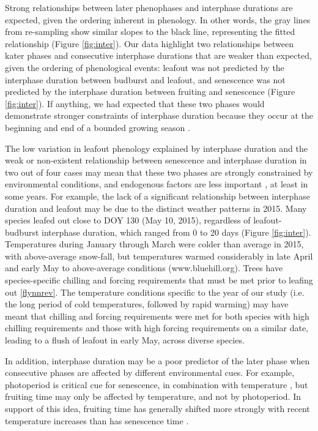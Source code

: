 \documentclass{article}
\begin{document}
\par Strong relationships between later phenophases and interphase durations are expected, given the ordering inherent in phenology.  In other words, the gray lines from re-sampling show similar slopes to the black line, representing the fitted relationship (Figure \ref{fig:inter}).  Our data highlight two relationships between kater phases and consecutive interphase durations that are weaker than expected, given the ordering of phenological events: leafout was not predicted by the interphase duration between budburst and leafout, and senescence was not predicted by the interphase duration between fruiting and senescence (Figure \ref{fig:inter}). If anything, we had expected that these two phases would demonstrate stronger constraints of interphase duration because they occur at the beginning and end of a bounded growing season \citep{letten2013}.
\par The low variation in leafout phenology explained by interphase duration  and the weak or non-existent relationship between senescence and interphase duration in two out of four cases may mean that these two phases are strongly constrained by environmental conditions, and endogenous factors are less important \citep{fenner1998}, at least in some years. For example, the lack of a significant relationship between interphase duration and leafout may be due to the distinct weather patterns in 2015. Many species leafed out close to DOY 130 (May 10, 2015), regardless of leafout-budburst interphase duration, which ranged from 0 to 20 days (Figure \ref{fig:inter}). Temperatures during January through March were colder than average in 2015, with above-average snow-fall, but temperatures warmed considerably in late April and early May to above-average conditions (www.bluehill.org). Trees have species-specific chilling and forcing requirements that must be met prior to leafing out \ref{flynnrev}. The temperature conditions specific to the year of our study (i.e. the long period of cold temperatures, followed by rapid warming) may have meant that chilling and forcing requirements were met for both species with high chilling requirements and those with high forcing requirements on a similar date, leading to a flush of leafout in early May, across diverse species. 
\par In addition, interphase duration may be a poor predictor of the later phase when consecutive phases are affected by different environmental cues. For example, photoperiod is critical cue for senescence, in combination with temperature \citep{delpierre2009}, but fruiting time may only be affected by temperature, and not by photoperiod. In support of this idea, fruiting time has generally shifted more strongly with recent temperature increases than has senescence time \citep{menzel2006}.
\end{document}
